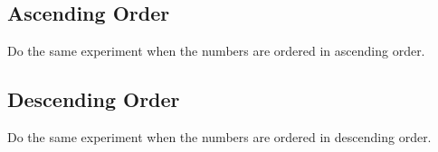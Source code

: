 \documentclass{article}
\begin{document}
\subsection{Ascending Order}
Do the same experiment when the numbers are ordered in ascending order.

\subsection{Descending Order}
Do the same experiment when the numbers are ordered in descending order.
\end{document}
